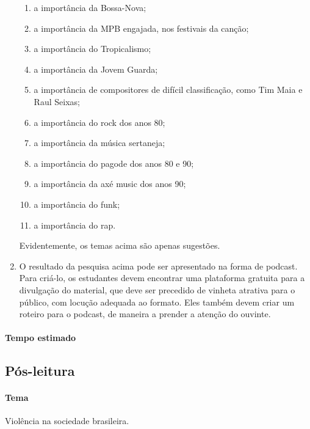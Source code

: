 \documentclass[11pt]{extarticle}
\begin{document}
\begin{enumerate}
\begin{enumerate}
\item a importância da Bossa-Nova;

\item a importância da MPB engajada, nos festivais da canção;

\item a importância do Tropicalismo;

\item a importância da Jovem Guarda;

\item a importância de compositores de difícil classificação, como Tim Maia
e Raul Seixas;

\item a importância do rock dos anos 80;

\item a importância da música sertaneja;

\item a importância do pagode dos anos 80 e 90;

\item a importância da axé music dos anos 90;

\item a importância do funk;

\item a importância do rap.
\end{enumerate}

Evidentemente, os temas acima são apenas sugestões.

\item O resultado da pesquisa acima pode ser apresentado na forma de
podcast. Para criá-lo, os estudantes devem encontrar uma plataforma
gratuita para a divulgação do material, que deve ser precedido de
vinheta atrativa para o público, com locução adequada ao formato. Eles
também devem criar um roteiro para o podcast, de maneira a prender a
atenção do ouvinte.
\end{enumerate}

\paragraph{Tempo estimado}

\subsection{Pós-leitura}

\paragraph{Tema} Violência na sociedade brasileira.
\end{document}
